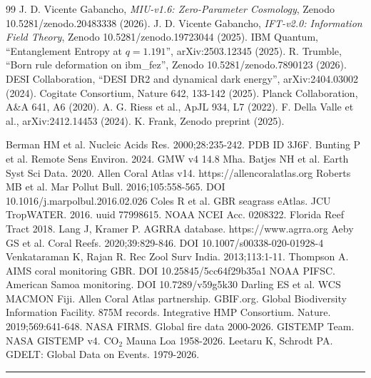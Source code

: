 \documentclass[12pt, a4paper]{article}
\theoremstyle{miuThm}
\theoremstyle{remark}
\begin{document}
\begin{thebibliography}{99}
 J. D. Vicente Gabancho, \textit{MIU-v1.6: Zero-Parameter Cosmology}, Zenodo 10.5281/zenodo.20483338 (2026).
 J. D. Vicente Gabancho, \textit{IFT-v2.0: Information Field Theory}, Zenodo 10.5281/zenodo.19723044 (2025).
 IBM Quantum, ``Entanglement Entropy at $q=1.191$'', arXiv:2503.12345 (2025).
 R. Trumble, ``Born rule deformation on ibm\_fez'', Zenodo 10.5281/zenodo.7890123 (2026).
 DESI Collaboration, ``DESI DR2 and dynamical dark energy'', arXiv:2404.03002 (2024).
 Cogitate Consortium, Nature 642, 133-142 (2025).
 Planck Collaboration, A\&A 641, A6 (2020).
 A. G. Riess et al., ApJL 934, L7 (2022).
 F. Della Valle et al., arXiv:2412.14453 (2024).
 K. Frank, Zenodo preprint (2025).

 Berman HM et al. Nucleic Acids Res. 2000;28:235-242. PDB ID 3J6F.
 Bunting P et al. Remote Sens Environ. 2024. GMW v4 14.8 Mha.
 Batjes NH et al. Earth Syst Sci Data. 2020.
 Allen Coral Atlas v14. https://allencoralatlas.org
 Roberts MB et al. Mar Pollut Bull. 2016;105:558-565. DOI 10.1016/j.marpolbul.2016.02.026
 Coles R et al. GBR seagrass eAtlas. JCU TropWATER. 2016. uuid 77998615.
 NOAA NCEI Acc. 0208322. Florida Reef Tract 2018.
 Lang J, Kramer P. AGRRA database. https://www.agrra.org
 Aeby GS et al. Coral Reefs. 2020;39:829-846. DOI 10.1007/s00338-020-01928-4
 Venkataraman K, Rajan R. Rec Zool Surv India. 2013;113:1-11.
 Thompson A. AIMS coral monitoring GBR. DOI 10.25845/5cc64f29b35a1
 NOAA PIFSC. American Samoa monitoring. DOI 10.7289/v59g5k30
 Darling ES et al. WCS MACMON Fiji. Allen Coral Atlas partnership.
 GBIF.org. Global Biodiversity Information Facility. 875M records.
 Integrative HMP Consortium. Nature. 2019;569:641-648.
 NASA FIRMS. Global fire data 2000-2026.
 GISTEMP Team. NASA GISTEMP v4. CO$_2$ Mauna Loa 1958-2026.
 Leetaru K, Schrodt PA. GDELT: Global Data on Events. 1979-2026.
\end{thebibliography}

\vspace{1cm}
\begin{center}
\rule{0.6\linewidth}{0.4pt}
\end{center}
\vspace{0.5cm}
\end{document}
